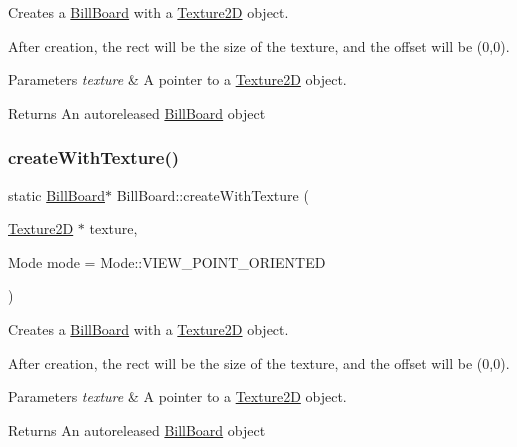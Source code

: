Creates a \hyperlink{classBillBoard}{Bill\+Board} with a \hyperlink{classTexture2D}{Texture2D} object.

After creation, the rect will be the size of the texture, and the offset will be (0,0).


\begin{DoxyParams}{Parameters}
{\em texture} & A pointer to a \hyperlink{classTexture2D}{Texture2D} object. \\
\hline
\end{DoxyParams}
\begin{DoxyReturn}{Returns}
An autoreleased \hyperlink{classBillBoard}{Bill\+Board} object 
\end{DoxyReturn}
\mbox{\label{classBillBoard_a973b81af43b98d2d8a89f4db7ca660dd}} 
\subsubsection{\texorpdfstring{create\+With\+Texture()}{createWithTexture()}\hspace{0.1cm}{\footnotesize\ttfamily [2/2]}}
{\footnotesize\ttfamily static \hyperlink{classBillBoard}{Bill\+Board}$\ast$ Bill\+Board\+::create\+With\+Texture (\begin{DoxyParamCaption}\item[{\hyperlink{classTexture2D}{Texture2D} $\ast$}]{texture,  }\item[{Mode}]{mode = {\ttfamily Mode\+:\+:VIEW\+\_\+POINT\+\_\+ORIENTED} }\end{DoxyParamCaption})\hspace{0.3cm}{\ttfamily [static]}}

Creates a \hyperlink{classBillBoard}{Bill\+Board} with a \hyperlink{classTexture2D}{Texture2D} object.

After creation, the rect will be the size of the texture, and the offset will be (0,0).


\begin{DoxyParams}{Parameters}
{\em texture} & A pointer to a \hyperlink{classTexture2D}{Texture2D} object. \\
\hline
\end{DoxyParams}
\begin{DoxyReturn}{Returns}
An autoreleased \hyperlink{classBillBoard}{Bill\+Board} object 
\end{DoxyReturn}
\mbox{\label{classBillBoard_ab8ccc9dc2cbbf46f1f2a56cd0283ce94}} 
